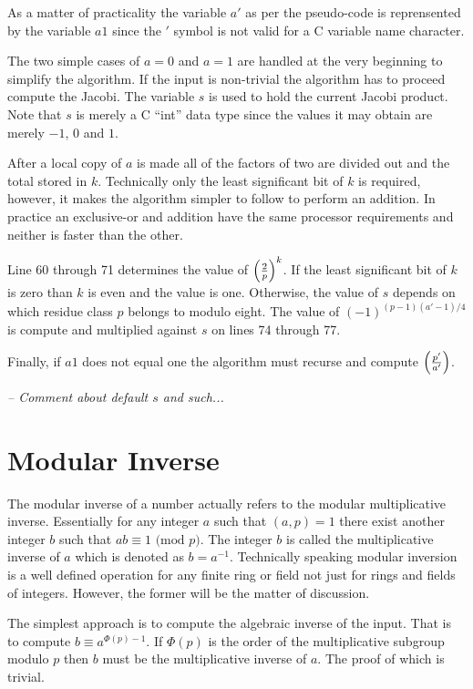 \documentclass[b5paper]{book}
\begin{document}
As a matter of practicality the variable $a'$ as per the pseudo-code is reprensented by the variable $a1$ since the $'$ symbol is not valid for a C 
variable name character. 

The two simple cases of $a = 0$ and $a = 1$ are handled at the very beginning to simplify the algorithm.  If the input is non-trivial the algorithm
has to proceed compute the Jacobi.  The variable $s$ is used to hold the current Jacobi product.  Note that $s$ is merely a C ``int'' data type since
the values it may obtain are merely $-1$, $0$ and $1$.  

After a local copy of $a$ is made all of the factors of two are divided out and the total stored in $k$.  Technically only the least significant
bit of $k$ is required, however, it makes the algorithm simpler to follow to perform an addition. In practice an exclusive-or and addition have the same 
processor requirements and neither is faster than the other.

Line 60 through 71 determines the value of $\left ( { 2 \over p } \right )^k$.  If the least significant bit of $k$ is zero than
$k$ is even and the value is one.  Otherwise, the value of $s$ depends on which residue class $p$ belongs to modulo eight.  The value of
$(-1)^{(p-1)(a'-1)/4}$ is compute and multiplied against $s$ on lines 74 through 77.  

Finally, if $a1$ does not equal one the algorithm must recurse and compute $\left ( {p' \over a'} \right )$.  

\textit{-- Comment about default $s$ and such...}

\section{Modular Inverse}
\label{sec:modinv}
The modular inverse of a number actually refers to the modular multiplicative inverse.  Essentially for any integer $a$ such that $(a, p) = 1$ there
exist another integer $b$ such that $ab \equiv 1 \mbox{ (mod }p\mbox{)}$.  The integer $b$ is called the multiplicative inverse of $a$ which is
denoted as $b = a^{-1}$.  Technically speaking modular inversion is a well defined operation for any finite ring or field not just for rings and 
fields of integers.  However, the former will be the matter of discussion.

The simplest approach is to compute the algebraic inverse of the input.  That is to compute $b \equiv a^{\Phi(p) - 1}$.  If $\Phi(p)$ is the 
order of the multiplicative subgroup modulo $p$ then $b$ must be the multiplicative inverse of $a$.  The proof of which is trivial.
\end{document}
